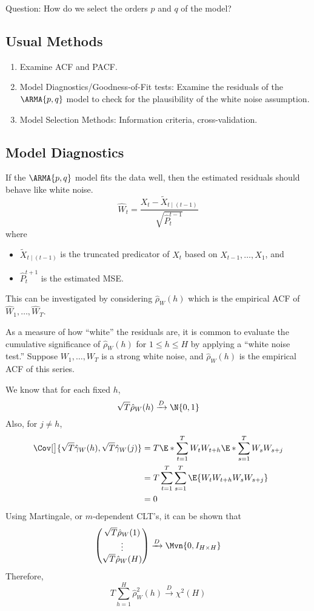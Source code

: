Question: How do we select the orders $ p $ and $ q $ of the model?
\subsection*{Usual Methods}
\begin{enumerate}[(1)]
    \item Examine ACF and PACF\@.
    \item Model Diagnostics/Goodness-of-Fit tests:
          Examine the residuals of the $ \ARMA{p,q} $ model to check for the plausibility
          of the white noise assumption.
    \item Model Selection Methods: Information criteria, cross-validation.
\end{enumerate}
\subsection*{Model Diagnostics}
If the $ \ARMA{p,q} $ model fits the data well, then the estimated residuals
should behave like white noise.
\[ \hat{W}_{t}=\frac{X_t-\tilde{X}_{t\mid (t-1)}}{\sqrt{\hat{P}^{t-1}_{t}}}  \]
where
\begin{itemize}
    \item $ \tilde{X}_{t\mid(t-1)} $ is the truncated predicator of $ X_t $
          based on $ X_{t-1},\ldots,X_1 $, and
    \item $ \hat{P}_t^{t+1} $ is the estimated MSE\@.
\end{itemize}
This can be investigated by considering
$ \hat{\rho}_W(h) $
which is the empirical ACF of $ \hat{W}_1,\ldots,\hat{W}_T $.

As a measure of how ``white'' the residuals are, it is common
to evaluate the cumulative significance of $ \hat{\rho}_W(h) $
for $ 1\le h\le H $ by applying a ``white noise test.''
Suppose $ W_1,\ldots,W_T $ is a strong white noise, and
$ \hat{\rho}_W(h) $ is the empirical ACF of this series.

We know that for each fixed $ h $,
\[ \sqrt{T}\hat{\rho}_W(h)\xrightarrow{D}\N{0,1} \]
Also, for $ j\ne h $,
\begin{align*}
    \Cov[\big]{\sqrt{T}\hat{\gamma}_W(h),\sqrt{T}\hat{\gamma}_W(j)}
     & =T\E*{\sum_{t=1}^{T} W_t W_{t+h}}\E*{\sum_{s=1}^{T} W_s W_{s+j}} \\
     & =T \sum_{t=1}^{T} \sum_{s=1}^{T} \E{W_{t}W_{t+h}W_{s}W_{s+j}}    \\
     & =0
\end{align*}
Using Martingale, or $ m $-dependent CLT's, it can be shown that
\[ \begin{pmatrix}
        \sqrt{T}\hat{\rho}_W(1) \\
        \vdots                  \\
        \sqrt{T}\hat{\rho}_W(H)
    \end{pmatrix}
    \xrightarrow{D} \Mvn{0,I_{H\times H}} \]
Therefore,
\[ T \sum_{h=1}^{H} \hat{\rho}_W^2(h)
    \xrightarrow{D}\chi^2(H) \]

